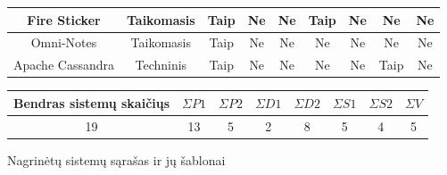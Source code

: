 \begin{figure}[H]
\begin{center}
\begin{tabular}{|c|c|c|c|c|c|c|c|c|}
            Fire Sticker                    & Taikomasis                & Taip                          & Ne                            & Ne                         & Taip                       & Ne                 & Ne                 & Ne                  \\ \hline
            Omni-Notes                      & Taikomasis                & Taip                          & Ne                            & Ne                         & Ne                         & Ne                 & Ne                 & Ne                  \\ \hline
            Apache Cassandra                & Techninis                 & Taip                          & Ne                            & Ne                         & Ne                         & Ne                 & Taip               & Ne                  \\ \hline
        \end{tabular}

        \begin{tabular}{|c|c|c|c|c|c|c|c|}
            \hline
            Bendras sistemų skaičiųs & $\Sigma P1 $ & $\Sigma P2 $ & $\Sigma D1 $ & $\Sigma D2 $ & $\Sigma  S1 $ & $\Sigma  S2 $ & $\Sigma V $ \\ \hline\hline
            19 & 13 & 5 & 2 & 8 & 5 & 4 & 5 \\ \hline
        \end{tabular}
    \end{center}
    \caption{Nagrinėtų sistemų sąrašas ir jų šablonai}
    \label{table:analizedSystems}
\end{figure}


